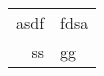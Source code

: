 \documentclass[10pt,a4paper,twoside]{article}
\begin{document}
	\begin{tabular}{|r|l|}
		asdf  & fdsa \\ 
		ss & gg \\ 
	\end{tabular} 
\end{document}
